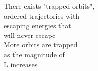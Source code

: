 \documentclass[preview]{standalone}
\begin{document}
There exists "trapped orbits",\\ordered trajectories with\\escaping energies that\\will never escape\\More orbits are trapped\\as the magnitude of\\L increases\\
\end{document}
